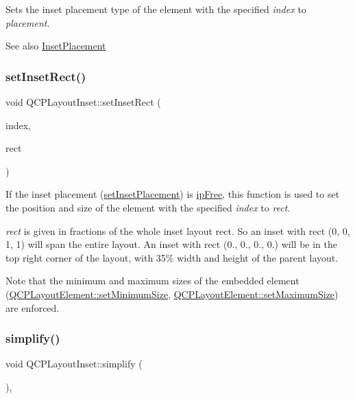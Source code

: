 Sets the inset placement type of the element with the specified {\itshape index} to {\itshape placement}.

\begin{DoxySeeAlso}{See also}
\mbox{\hyperlink{class_q_c_p_layout_inset_a8b9e17d9a2768293d2a7d72f5e298192}{Inset\+Placement}} 
\end{DoxySeeAlso}
\mbox{\label{class_q_c_p_layout_inset_aa487c8378a6f9533567a2e6430099dc3}} 
\subsubsection{\texorpdfstring{setInsetRect()}{setInsetRect()}}
{\footnotesize\ttfamily void Q\+C\+P\+Layout\+Inset\+::set\+Inset\+Rect (\begin{DoxyParamCaption}\item[{int}]{index,  }\item[{const Q\+RectF \&}]{rect }\end{DoxyParamCaption})}

If the inset placement (\mbox{\hyperlink{class_q_c_p_layout_inset_a63298830744d5d8c5345511c00fd2144}{set\+Inset\+Placement}}) is \mbox{\hyperlink{class_q_c_p_layout_inset_a8b9e17d9a2768293d2a7d72f5e298192aa4802986ea2cea457f932b115acba59e}{ip\+Free}}, this function is used to set the position and size of the element with the specified {\itshape index} to {\itshape rect}.

{\itshape rect} is given in fractions of the whole inset layout rect. So an inset with rect (0, 0, 1, 1) will span the entire layout. An inset with rect (0., 0., 0., 0.) will be in the top right corner of the layout, with 35\% width and height of the parent layout.

Note that the minimum and maximum sizes of the embedded element (\mbox{\hyperlink{class_q_c_p_layout_element_a5dd29a3c8bc88440c97c06b67be7886b}{Q\+C\+P\+Layout\+Element\+::set\+Minimum\+Size}}, \mbox{\hyperlink{class_q_c_p_layout_element_a74eb5280a737ab44833d506db65efd95}{Q\+C\+P\+Layout\+Element\+::set\+Maximum\+Size}}) are enforced. \mbox{\label{class_q_c_p_layout_inset_a18b7d508f0baa60cc5dcb1343cf7f32a}} 
\subsubsection{\texorpdfstring{simplify()}{simplify()}}
{\footnotesize\ttfamily void Q\+C\+P\+Layout\+Inset\+::simplify (\begin{DoxyParamCaption}{ }\end{DoxyParamCaption})\hspace{0.3cm}{\ttfamily [inline]}, {\ttfamily [virtual]}}

